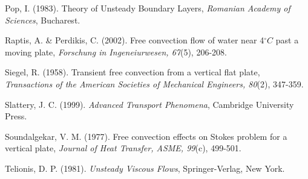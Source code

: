 \documentclass[11pt]{report}
\begin{document}
\begin{description}
		
		\item Pop, I. (1983). Theory of Unsteady Boundary Layers, \emph{Romanian Academy of Sciences}, Bucharest.
		
		
		\item Raptis, A. \& Perdikis, C. (2002). Free convection flow of water near 4$^\circ C$ past a moving plate, \emph{Forschung in Ingeneiurwesen, 67}(5), 206-208.
		
		
		\item Siegel, R. (1958). Transient free convection from a vertical flat plate, \emph{Transactions of the American Societies of Mechanical Engineers, 80}(2), 347-359.
		
		
		\item Slattery, J. C. (1999). \emph{Advanced Transport Phenomena}, Cambridge University Press.
		
		
		\item  Soundalgekar, V. M. (1977). Free convection effects on Stokes problem for a vertical plate, \emph{Journal of Heat Transfer, ASME, 99}(c), 499-501.
		
		
		\item Telionis, D. P. (1981). \emph{Unsteady Viscous Flows}, Springer-Verlag, New York.

	\end{description}
\end{document}
